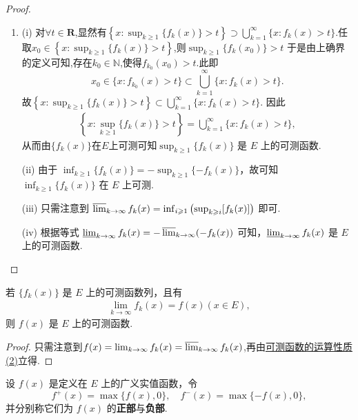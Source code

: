 \documentclass[../../main.tex]{subfiles}
\begin{document}
\begin{proof}
\begin{enumerate}[(1)]
\item (i) 对$\forall t \in \mathbf{R}$,显然有$\left\{x: \sup_{k \geqslant 1}\{f_k(x)\} > t\right\} \supset \bigcup_{k = 1}^{\infty}\{x: f_k(x) > t\}.$任取$x_0\in \left\{x: \sup_{k \geqslant 1}\{f_k(x)\} > t\right\}$,则$ \sup_{k \geqslant 1}\{f_k(x_0)\} > t$
于是由上确界的定义可知,存在$k_0\in \mathbb{N}$,使得$f_{k_0}(x_0)>t$.此即$$x_0\in \{x: f_{k_0}(x) > t\}\subset \bigcup_{k = 1}^{\infty}\{x: f_k(x) > t\}.$$
故$\left\{x: \sup_{k \geqslant 1}\{f_k(x)\} > t\right\} \subset \bigcup_{k = 1}^{\infty}\{x: f_k(x) > t\}.$
因此
\begin{align*}
\left\{x: \sup_{k \geqslant 1}\{f_k(x)\} > t\right\} = \bigcup_{k = 1}^{\infty}\{x: f_k(x) > t\},
\end{align*}
从而由$\{f_k(x)\}$在$E$上可测可知\(\sup_{k \geqslant 1}\{f_k(x)\}\) 是 \(E\) 上的可测函数.

(ii) 由于 \(\inf_{k \geqslant 1}\{f_k(x)\} = -\sup_{k \geqslant 1}\{-f_k(x)\}\)，故可知 \(\inf_{k \geqslant 1}\{f_k(x)\}\) 在 \(E\) 上可测.

(iii) 只需注意到 \(\varlimsup_{k \to \infty} f_k(x) = \inf_{i \geqslant 1}\left(\sup_{k \geqslant i}[f_k(x)]\right)\) 即可.

(iv) 根据等式 \(\varliminf_{k \to \infty} f_k(x) = -\varlimsup_{k \to \infty}(-f_k(x))\) 可知，\(\varliminf_{k \to \infty} f_k(x)\) 是 \(E\) 上的可测函数. 
\end{enumerate}
\end{proof}

\begin{corollary}\label{corollary:可测函数列的极限也可测}
若 \(\{f_k(x)\}\) 是 \(E\) 上的可测函数列，且有
\begin{align*}
\lim_{k \to \infty}f_k(x) = f(x) (x \in E),
\end{align*}
则 \(f(x)\) 是 \(E\) 上的可测函数. 
\end{corollary}
\begin{proof}
只需注意到$f(x)=\lim_{k\to \infty}f_k(x)=\varlimsup_{k\to \infty}f_k(x)$,再由\hyperref[theorem:可测函数的运算性质]{可测函数的运算性质(2)}立得.
\end{proof}

\begin{definition}[函数的正部和负部]
设 \(f(x)\) 是定义在 \(E\) 上的广义实值函数，令
\[
f^+(x) = \max\{f(x),0\}, \quad f^-(x) = \max\{-f(x),0\},
\]
并分别称它们为 \(f(x)\) 的\textbf{正部}与\textbf{负部}.
\end{definition}
\end{document}
